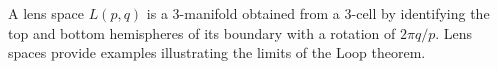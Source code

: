 A lens space $L(p, q)$ is a 3-manifold obtained from a 3-cell by identifying the top and bottom hemispheres of its boundary with a rotation of $2\pi q/p$. Lens spaces provide examples illustrating the limits of the Loop theorem.
